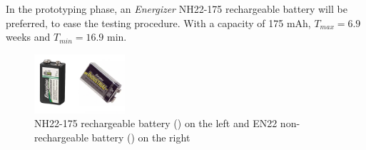 \medskip In the prototyping phase, an \textit{Energizer} NH22-175 rechargeable battery will be preferred, to ease the testing procedure. With a capacity of 175 mAh, $T_{max} = 6.9$ weeks and $T_{min} = 16.9$ min.

\begin{figure}[H]
    \centering
    \includegraphics[width=0.30\textwidth]{images/EE_Battery.JPG}
    \caption{NH22-175 rechargeable battery (\cite{batterydatasheet}) on the left and EN22 non-rechargeable battery (\cite{battery2datasheet}) on the right}
    \label{fig:recharg_battery}
\end{figure}


